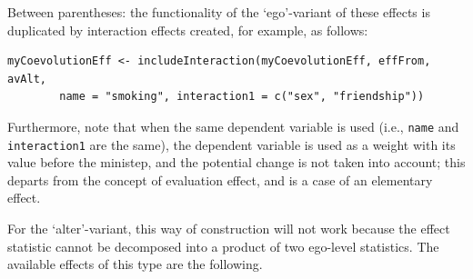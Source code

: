 \documentclass[a4paper,fleqn,11pt]{article}
\newcommand{\+}{\, + \,}
\begin{document}
Between parentheses: the functionality of the `ego'-variant of these effects is duplicated by
interaction effects created, for example, as follows:
\begin{verbatim}
myCoevolutionEff <- includeInteraction(myCoevolutionEff, effFrom, avAlt,
        name = "smoking", interaction1 = c("sex", "friendship"))
\end{verbatim}
Furthermore, note that when the same dependent variable is used
(i.e., \texttt{name} and \texttt{interaction1} are the same),
the dependent variable is used as a weight with its value
before the ministep, and the potential change is not taken into account;
this departs from the concept of evaluation effect,
and is a case of an elementary effect.

For the `alter'-variant, this way of construction will not work because the
effect statistic cannot be decomposed into a product of two ego-level statistics.
The available effects of this type are the following.
\end{document}

